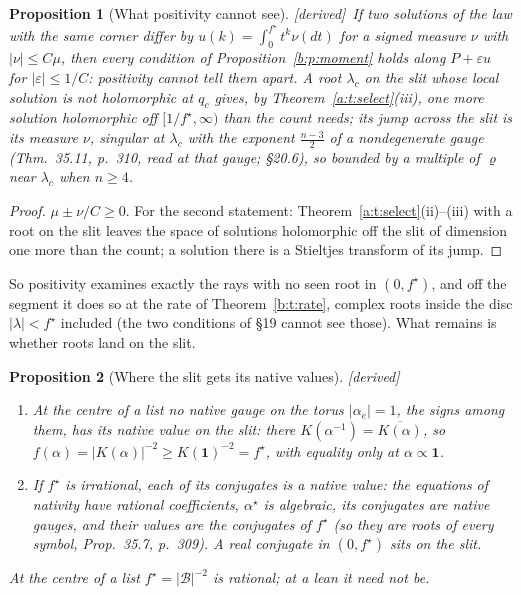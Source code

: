 \documentclass[11pt]{article}
\newcommand{\cB}{\mathcal B}
\newcommand{\one}{\mathbf 1}
\theoremstyle{plain}
\newtheorem{proposition}{Proposition}[section]
\theoremstyle{definition}
\theoremstyle{remark}
\newcommand{\derived}{\textup{[derived]}}
\begin{document}
\begin{proposition}[What positivity cannot see]\label{b:p:blind}\derived\
If two solutions of the law with the same corner differ by $u(k)=\int_0^{f^\star}t^k\nu(dt)$ for a signed measure $\nu$ with $|\nu|\le C\mu$, then every condition of Proposition~\ref{b:p:moment} holds along $P+\varepsilon u$ for $|\varepsilon|\le1/C$: positivity cannot tell them apart. A root $\lambda_c$ on the slit whose local solution is not holomorphic at $q_c$ gives, by Theorem~\ref{a:t:select}(iii), one more solution holomorphic off $[1/f^\star,\infty)$ than the count needs; its jump across the slit is its measure $\nu$, singular at $\lambda_c$ with the exponent $\frac{n-3}2$ of a nondegenerate gauge (Thm.~35.11, p.~310, read at that gauge; \S20.6), so bounded by a multiple of $\varrho$ near $\lambda_c$ when $n\ge4$.
\end{proposition}

\begin{proof}
$\mu\pm\nu/C\ge0$. For the second statement: Theorem~\ref{a:t:select}(ii)--(iii) with a root on the slit leaves the space of solutions holomorphic off the slit of dimension one more than the count; a solution there is a Stieltjes transform of its jump.
\end{proof}

So positivity examines exactly the rays with no seen root in $(0,f^\star)$, and off the segment it does so at the rate of Theorem~\ref{b:t:rate}, complex roots inside the disc $|\lambda|<f^\star$ included (the two conditions of \S19 cannot see those). What remains is whether roots land on the slit.

\begin{proposition}[Where the slit gets its native values]\label{b:p:slitorigin}\derived\
\begin{enumerate}[label=(\roman*)]
\item At the centre of a list no native gauge on the torus $|\alpha_e|=1$, the signs among them, has its native value on the slit: there $K(\alpha^{-1})=\overline{K(\alpha)}$, so $f(\alpha)=|K(\alpha)|^{-2}\ge K(\one)^{-2}=f^\star$, with equality only at $\alpha\propto\one$.
\item If $f^\star$ is irrational, each of its conjugates is a native value: the equations of nativity have rational coefficients, $\alpha^\star$ is algebraic, its conjugates are native gauges, and their values are the conjugates of $f^\star$ (so they are roots of every symbol, Prop.~35.7, p.~309). A real conjugate in $(0,f^\star)$ sits on the slit.
\end{enumerate}
At the centre of a list $f^\star=|\cB|^{-2}$ is rational; at a lean it need not be.
\end{proposition}
\end{document}
